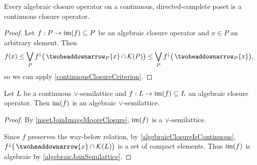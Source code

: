 \begin{lemma} \label{algebraicClosureIsContinuous}
Every algebraic closure operator on a continuous, directed-complete poset is a continuous closure operator.
\end{lemma}
\begin{proof}
Let $f: P\to \operatorname{im}(f)\subseteq P$ be an algebraic closure operator and $x\in P$ an arbitrary element. Then
\[ f(x) \leq \bigvee_{P} f^\imf\big(\ddownset_P\{x\}\cap \compacts(P)\big) \leq \bigvee_{P} f^\imf\big(\ddownset_P\{x\}\big), \]
so we can apply \ref{continuousClosureCriterion}.
\end{proof}

\begin{proposition} \label{imageAlgebraicClosureAlgebraicLattice}
Let $L$ be a continuous $\vee$-semilattice and $f: L\to \operatorname{im}(f)\subseteq L$ an algebraic closure operator. Then $\operatorname{im}(f)$ is an algebraic $\vee$-semilattice.
\end{proposition}
\begin{proof}
By \ref{meetJoinImageMooreClosure}, $\operatorname{im}(f)$ is a $\vee$-semilattice. 

Since $f$ preserves the way-below relation, by \ref{algebraicClosureIsContinuous}, $f^\imf\big(\ddownset\{x\}\cap \compacts(L)\big)$ is a set of compact elements. Thus $\operatorname{im}(f)$ is algebraic by \ref{algebraicJoinSemilattice}.
\end{proof}

